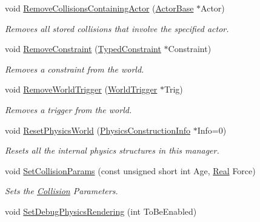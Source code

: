 \begin{DoxyCompactItemize}
void \hyperlink{classMezzanine_1_1PhysicsManager_a7180bd17285d6c37979e32c3cebc6230}{RemoveCollisionsContainingActor} (\hyperlink{classMezzanine_1_1ActorBase}{ActorBase} $\ast$Actor)
\begin{DoxyCompactList}\small\item\em Removes all stored collisions that involve the specified actor. \item\end{DoxyCompactList}\item 
void \hyperlink{classMezzanine_1_1PhysicsManager_a78713bb51e2d3247964647bc35f166f8}{RemoveConstraint} (\hyperlink{classMezzanine_1_1TypedConstraint}{TypedConstraint} $\ast$Constraint)
\begin{DoxyCompactList}\small\item\em Removes a constraint from the world. \item\end{DoxyCompactList}\item 
void \hyperlink{classMezzanine_1_1PhysicsManager_ab3d96f132ab95690c520348f986140b8}{RemoveWorldTrigger} (\hyperlink{classMezzanine_1_1WorldTrigger}{WorldTrigger} $\ast$Trig)
\begin{DoxyCompactList}\small\item\em Removes a trigger from the world. \item\end{DoxyCompactList}\item 
void \hyperlink{classMezzanine_1_1PhysicsManager_aa4333ad1d8382ead2401e2870603ae89}{ResetPhysicsWorld} (\hyperlink{classMezzanine_1_1PhysicsConstructionInfo}{PhysicsConstructionInfo} $\ast$Info=0)
\begin{DoxyCompactList}\small\item\em Resets all the internal physics structures in this manager. \item\end{DoxyCompactList}\item 
void \hyperlink{classMezzanine_1_1PhysicsManager_acda375c8effd99c6bb01f2aeb0e55741}{SetCollisionParams} (const unsigned short int Age, \hyperlink{namespaceMezzanine_a726731b1a7df72bf3583e4a97282c6f6}{Real} Force)
\begin{DoxyCompactList}\small\item\em Sets the \hyperlink{classMezzanine_1_1Collision}{Collision} Parameters. \item\end{DoxyCompactList}\item 
void \hyperlink{classMezzanine_1_1PhysicsManager_ac1104ad21c6c779bb93147163d066f7e}{SetDebugPhysicsRendering} (int ToBeEnabled)

\end{DoxyCompactItemize}
